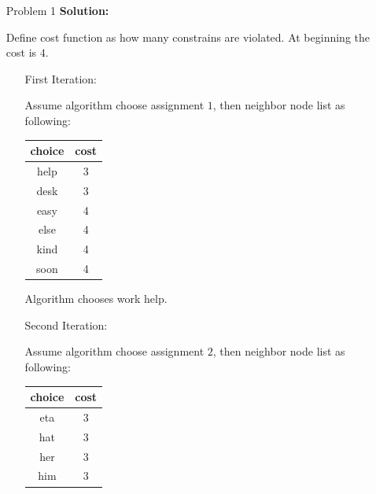 \normalfont\documentclass[letterpaper,11pt]{article}
\begin{document}
\setlength{\parindent}{2ex}
\newcommand{\header}{
	\noindent {}
}
\bigskip
\header

\begin{enumerate}
\item[Problem 1]\textbf{Solution:}\par
	Define cost function as how many constrains are violated. At beginning the cost is $4$.
	\begin{enumerate}
		\item[First Iteration:]\par
			Assume algorithm choose assignment $1$, then neighbor node list as following:\par
			\begin{table}[htbp]
			\center
				\begin{tabular}{cc}
				\hline
				choice & cost\\
				\hline
				help& 3\\
				desk& 3\\
				easy& 4\\
				else& 4\\			
				kind& 4\\
				soon& 4\\
				\hline
				\end{tabular}
			\end{table}
			Algorithm chooses work help.
		\item[Second Iteration:]\par
			Assume algorithm choose assignment $2$, then neighbor node list as following:\par
			\begin{table}[!hbp]
			\center
				\begin{tabular}{cc}
				\hline
				choice & cost\\
				\hline
				eta& 3\\
				hat& 3\\
				her& 3\\
				him& 3\\

\end{tabular}
\end{table}
\end{enumerate}
\end{enumerate}
\end{document}

